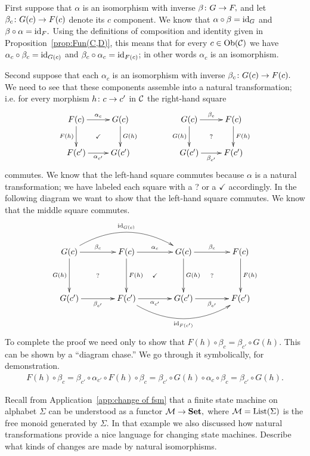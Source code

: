 \documentclass[CT4S-EN-RU]{subfiles}
\begin{document}
\begin{proofENG}
First suppose that $\alpha$ is an isomorphism with inverse $\beta\colon G\rightarrow F,$ and let $\beta_c\colon G(c)\rightarrow F(c)$ denote its $c$ component. We know that $\alpha\circ\beta=\textnormal{id}_G$ and $\beta\circ\alpha=\textnormal{id}_F.$ Using the definitions of composition and identity given in Proposition~\ref{prop:Fun(C,D)}, this means that for every $c\in\textnormal{Ob}(\mathcal{C})$ we have $\alpha_c\circ\beta_c=\textnormal{id}_{G(c)}$ and $\beta_c\circ\alpha_c=\textnormal{id}_{F(c)}$; in other words $\alpha_c$ is an isomorphism.

Second suppose that each $\alpha_c$ is an isomorphism with inverse $\beta_c\colon G(c)\rightarrow F(c).$ We need to see that these components assemble into a natural transformation; i.e. for every morphism $h\colon c\rightarrow c'$ in $\mathcal{C}$ the right-hand square 
$$
\xymatrix{F(c)\ar@{}[dr]|{\checkmark}\ar[d]_{F(h)}\ar[r]^{\alpha_c}&G(c)\ar[d]^{G(h)}\\F(c')\ar[r]_{\alpha_{c'}}&G(c')}\hspace{.5in}
\xymatrix{G(c)\ar@{}[dr]|{?}\ar[d]_{G(h)}\ar[r]^{\beta_c}&F(c)\ar[d]^{F(h)}\\G(c')\ar[r]_{\beta_{c'}}&F(c')}
$$
commutes. We know that the left-hand square commutes because $\alpha$ is a natural transformation; we have labeled each square with a ? or a $\checkmark$ accordingly. In the following diagram we want to show that the left-hand square commutes. We know that the middle square commutes.
$$
\xymatrix@=40pt{G(c)\ar@/^2pc/[rr]^{\id_{G(c)}}\ar@{}[dr]|{?}\ar[d]_{G(h)}\ar[r]^{\beta_c}&F(c)\ar@{}[dr]|{\checkmark}\ar[d]^{F(h)}\ar[r]^{\alpha_c}&G(c)\ar@{}[dr]|{?}\ar[d]^{G(h)}\ar[r]^{\beta_c}&F(c)\ar[d]^{F(h)}\\
G(c')\ar[r]_{\beta_{c'}}&F(c')\ar[r]_{\alpha_{c'}}\ar@/_2pc/[rr]_{\id_{F(c')}}&G(c')\ar[r]_{\beta_{c'}}&F(c')}
$$
To complete the proof we need only to show that $F(h)\circ\beta_c=\beta_{c'}\circ G(h).$ This can be shown by a “diagram chase.” We go through it symbolically, for demonstration.
\begin{align*}
F(h)\circ\beta_c=\beta_{c'}\circ\alpha_{c'}\circ F(h)\circ\beta_c=\beta_{c'}\circ G(h)\circ\alpha_c\circ\beta_c=\beta_{c'}\circ G(h).
\end{align*}
\end{proofENG}

\begin{proofRUS}
\end{proofRUS}

\begin{exerciseENG}
Recall from Application~\ref{app:change of fsm} that a finite state machine on alphabet $\Sigma$ can be understood as a functor $\mathcal{M}\rightarrow{\mathbf{Set}},$ where $\mathcal{M}=\textnormal{List}(\Sigma)$ is the free monoid generated by $\Sigma.$ In that example we also discussed how natural transformations provide a nice language for changing state machines. Describe what kinds of changes are made by natural isomorphisms.
\end{exerciseENG}
\end{document}
